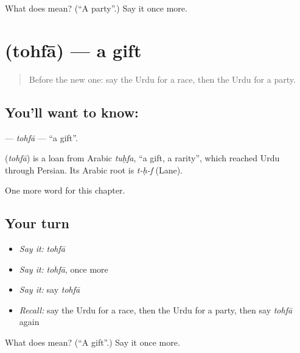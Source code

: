 \begin{tcolorbox}[breakable,colback=teal!4,colframe=teal!35!black,title={Before you move on}]
What does  mean? (\textquotedblleft{}A party\textquotedblright{}.) Say it once more.
\end{tcolorbox}
\section[\texorpdfstring{\ur{تحفہ} (tohfā)}{تحفہ (tohfā)}]{ (tohfā) — a gift}

\label{lesson:UR-C202-tohfa}



\begin{quote}
Before the new one: say the Urdu for a race, then the Urdu for a party.
\end{quote}

\subsection*{You'll want to know: }
\textbf{} — \emph{tohfā} — \textquotedblleft{}a gift\textquotedblright{}.

\begin{cousinweb}
\textbf{} (\emph{tohfā}) is a loan from Arabic \emph{tuḥfa}, \textquotedblleft{}a gift, a rarity\textquotedblright{}, which reached Urdu through Persian. Its Arabic root is \emph{t-ḥ-f} (Lane).
\end{cousinweb}

\begin{grammarlens}[title={What you've built}]
One more word for this chapter.
\end{grammarlens}

\subsection*{Your turn}
\begin{itemize}
\raggedright
  \item \emph{Say it:} \emph{tohfā}
  \item \emph{Say it:} \emph{tohfā}, once more
  \item \emph{Say it:} say \emph{tohfā}
  \item \emph{Recall:} say the Urdu for a race, then the Urdu for a party, then say \emph{tohfā} again
\end{itemize}

\begin{tcolorbox}[breakable,colback=teal!4,colframe=teal!35!black,title={Before you move on}]
What does  mean? (\textquotedblleft{}A gift\textquotedblright{}.) Say it once more.
\end{tcolorbox}
